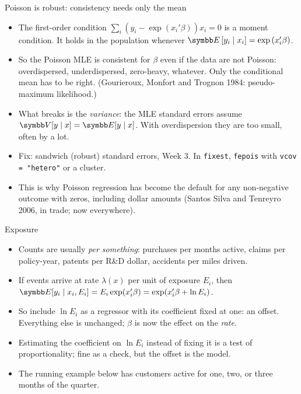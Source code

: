 \documentclass[aspectratio=169,11pt]{beamer}
\begin{document}
\begin{frame}{Poisson is robust: consistency needs only the mean}
\begin{itemize}
	\item The first-order condition
	$\sum_i \left(y_i -\exp\left(x_{i}'\beta \right) \right) x_{i} = 0$
	is a moment condition. It holds in the population whenever
	$\E\left[y_i \mid x_i\right] = \exp\left(x_{i}'\beta\right)$.
	\medskip
	\item So the Poisson MLE is consistent for $\beta$ \alert{even if the data are not Poisson}: overdispersed,
	underdispersed, zero-heavy, whatever. Only the conditional mean has to be right. (Gourieroux, Monfort and
	Trognon 1984: \alert{pseudo-maximum likelihood}.)
	\medskip
	\item What breaks is the \emph{variance}: the MLE standard errors assume $\Var[y \mid x] = \E[y \mid x]$.
	With overdispersion they are too small, often by a lot.
	\medskip
	\item Fix: sandwich (robust) standard errors, Week 3. In \texttt{fixest}, \texttt{fepois} with
	\texttt{vcov = "hetero"} or a cluster.
	\medskip
	\item This is why Poisson regression has become the default for any non-negative outcome with zeros,
	including dollar amounts (Santos Silva and Tenreyro 2006, in trade; now everywhere).
\end{itemize}
\end{frame}


\begin{frame}{Exposure}
\begin{itemize}
	\item Counts are usually \emph{per something}: purchases per \alert{months active}, claims per
	\alert{policy-year}, patents per \alert{R\&D dollar}, accidents per \alert{miles driven}.
	\medskip
	\item If events arrive at rate $\lambda(x)$ per unit of exposure $E_i$, then
	$\E[y_i \mid x_i, E_i] = E_i \exp(x_i'\beta) = \exp(x_i'\beta + \ln E_i)$.
	\medskip
	\item So include $\ln E_i$ as a regressor with its coefficient \alert{fixed at one}: an \alert{offset}.
	Everything else is unchanged; $\beta$ is now the effect on the \emph{rate}.
	\medskip
	\item Estimating the coefficient on $\ln E_i$ instead of fixing it is a test of proportionality;
	fine as a check, but the offset is the model.
	\medskip
	\item The running example below has customers active for one, two, or three months of the quarter.
\end{itemize}
\end{frame}
\end{document}
